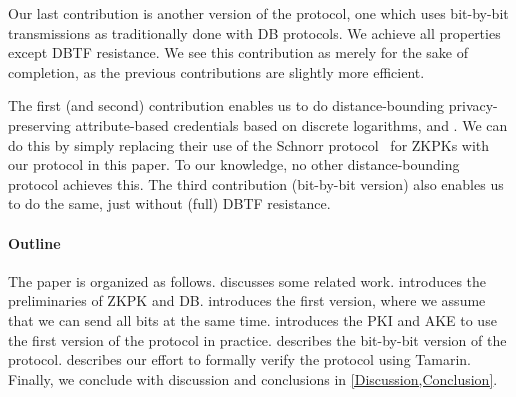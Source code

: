 Our last contribution is another version of the protocol, one which uses 
bit-by-bit transmissions as traditionally done with \ac{DB} protocols.
We achieve all properties except \ac{DBTF} resistance.
We see this contribution as merely for the sake of completion, as the previous 
contributions are slightly more efficient.

The first (and second) contribution enables us to do distance-bounding 
privacy-preserving attribute-based credentials based on discrete logarithms, 
\eg \cite{Camenisch-phdthesis} and \cite{CLsignatures}.
We can do this by simply replacing their use of the Schnorr 
protocol~\cite{Schnorr} for \acp{ZKPK} with our protocol in this paper.
To our knowledge, no other distance-bounding protocol achieves this.
The third contribution (bit-by-bit version) also enables us to do the same, 
just without (full) \ac{DBTF} resistance.

\paragraph*{Outline}

The paper is organized as follows.
 discusses some related work.
 introduces the preliminaries of \ac{ZKPK} and \ac{DB}.
 introduces the first version, where we assume that we can 
send all bits at the same time.
 introduces the \ac{PKI} and \ac{AKE} to use the first 
version of the protocol in practice.
 describes the bit-by-bit version of the protocol.
 describes our effort to formally verify the protocol 
using Tamarin.
Finally, we conclude with discussion and conclusions in 
\cref{Discussion,Conclusion}.
